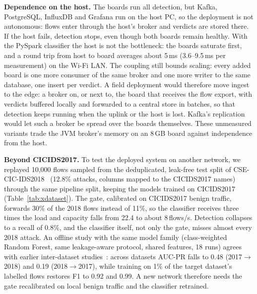 \documentclass[runningheads]{llncs}
\begin{document}
\textbf{Dependence on the host.} The boards run all detection, but Kafka, PostgreSQL, InfluxDB and Grafana run on the host PC, so the deployment is not autonomous: flows enter through the host's broker and verdicts are stored there. If the host fails, detection stops, even though both boards remain healthy. With the PySpark classifier the host is not the bottleneck: the boards saturate first, and a round trip from host to board averages about 5\,ms (3.6--9.5\,ms per measurement) on the Wi-Fi LAN. The coupling still bounds scaling: every added board is one more consumer of the same broker and one more writer to the same database, one insert per verdict. A field deployment would therefore move ingest to the edge: a broker on, or next to, the board that receives the flow export, with verdicts buffered locally and forwarded to a central store in batches, so that detection keeps running when the uplink or the host is lost. Kafka's replication would let such a broker be spread over the boards themselves. These unmeasured variants trade the JVM broker's memory on an 8\,GB board against independence from the host.

\textbf{Beyond CICIDS2017.} To test the deployed system on another network, we replayed 10{,}000 flows sampled from the deduplicated, leak-free test split of CSE-CIC-IDS2018~\cite{csecicids2018} (12.8\% attacks, columns mapped to the CICIDS2017 names) through the same pipeline split, keeping the models trained on CICIDS2017 (Table~\ref{tab:xdataset}). The gate, calibrated on CICIDS2017 benign traffic, forwards 30\% of the 2018 flows instead of 11\%, so the classifier receives three times the load and capacity falls from 22.4 to about 8\,flows/s. Detection collapses to a recall of 0.8\%, and the classifier itself, not only the gate, misses almost every 2018 attack. An offline study with the same model family (class-weighted Random Forest, same leakage-aware protocol, shared features, 18 runs) agrees with earlier inter-dataset studies~\cite{dhooge2020interdataset,cantone2024crossdataset}: across datasets AUC-PR falls to 0.48 (2017$\rightarrow$2018) and 0.19 (2018$\rightarrow$2017), while training on 1\% of the target dataset's labelled flows restores F1 to 0.92 and 0.99. A new network therefore needs the gate recalibrated on local benign traffic and the classifier retrained.
\end{document}
